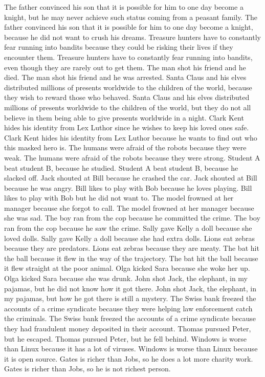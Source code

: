 \documentclass{article}
\begin{document}
\begin{enumerate}
	The father convinced his son that it is possible for him to one day become a knight, but he may never achieve such status coming from a peasant family.
	The father convinced his son that it is possible for him to one day become a knight, because he did not want to crush his dreams.
	Treasure hunters have to constantly fear running into bandits because they could be risking their lives if they encounter them.
	Treasure hunters have to constantly fear running into bandits, even though they are rarely out to get them.
	The man shot his friend and he died.
	The man shot his friend and he was arrested.
	Santa Claus and his elves distributed millions of presents worldwide to the children of the world, because they wish to reward those who behaved.
	Santa Claus and his elves distributed millions of presents worldwide to the children of the world, but they do not all believe in them being able to give presents worldwide in a night.
	Clark Kent hides his identity from Lex Luthor since he wishes to keep his loved ones safe.
	Clark Kent hides his identity from Lex Luthor because he wants to find out who this masked hero is.
	The humans were afraid of the robots because they were weak.
	The humans were afraid of the robots because they were strong.
	Student A beat student B, because he studied.
	Student A beat student B, because he slacked off.
	Jack shouted at Bill because he crashed the car.
	Jack shouted at Bill because he was angry.
	Bill likes to play with Bob because he loves playing.
	Bill likes to play with Bob but he did not want to.
	The model frowned at her manager because she forgot to call.
	The model frowned at her manager because she was sad.
	The boy ran from the cop because he committed the crime.
	The boy ran from the cop because he saw the crime.
	Sally gave Kelly a doll because she loved dolls.
	Sally gave Kelly a doll because she had extra dolls.
	Lions eat zebras because they are predators.
	Lions eat zebras because they are meaty.
	The bat hit the ball because it flew in the way of the trajectory.
	The bat hit the ball because it flew straight at the poor animal.
	Olga kicked Sara because she woke her up.
	Olga kicked Sara because she was drunk.
	John shot Jack, the elephant, in my pajamas, but he did not know how it got there.
	John shot Jack, the elephant, in my pajamas, but how he got there is still a mystery.
	The Swiss bank freezed the accounts of a crime syndicate because they were helping law enforcement catch the criminals.
	The Swiss bank freezed the accounts of a crime syndicate because they had fraudulent money deposited in their account.
	Thomas pursued Peter, but he escaped.
	Thomas pursued Peter, but he fell behind.
	Windows is worse than Linux because it has a lot of viruses.
	Windows is worse than Linux because it is open source.
	Gates is richer than Jobs, so he does a lot more charity work.
	Gates is richer than Jobs, so he is not richest person.
\end{enumerate}
\end{document}
